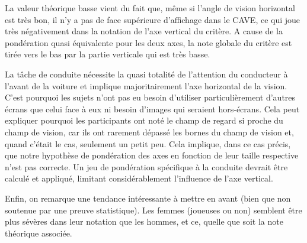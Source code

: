 	\par La valeur théorique basse vient du fait que, même si l'angle de vision horizontal est très bon, il n'y a pas de face supérieure d'affichage dans le CAVE, ce qui joue très négativement dans la notation de l'axe vertical du critère. A cause de la pondération quasi équivalente pour les deux axes, la note globale du critère est tirée vers le bas par la partie verticale qui est très basse.
	
	\par La tâche de conduite nécessite la quasi totalité de l'attention du conducteur à l'avant de la voiture et implique majoritairement l'axe horizontal de la vision. C'est pourquoi les sujets n'ont pas eu besoin d'utiliser particulièrement d'autres écrans que celui face à eux ni besoin d'images qui seraient hors-écrans. Cela peut expliquer pourquoi les participants ont noté le champ de regard si proche du champ de vision, car ils ont rarement dépassé les bornes du champ de vision et, quand c'était le cas, seulement un petit peu. Cela implique, dans ce cas précis, que notre hypothèse de pondération des axes en fonction de leur taille respective n'est pas correcte. Un jeu de pondération spécifique à la conduite devrait être calculé et appliqué, limitant considérablement l'influence de l'axe vertical.
	
	\par Enfin, on remarque une tendance intéressante à mettre en avant (bien que non soutenue par une preuve statistique). Les femmes (joueuses ou non) semblent être plus sévères dans leur notation que les hommes, et ce, quelle que soit la note théorique associée.